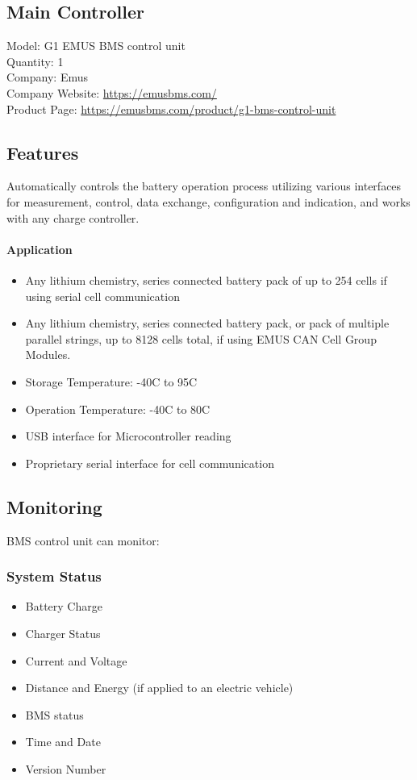 \subsection{Main Controller}

Model: G1 EMUS BMS control unit\\
Quantity: 1\\
Company: Emus\\
Company Website: \href{https://emusbms.com/}{https://emusbms.com/} \\
Product Page: \href{https://emusbms.com/product/g1-bms-control-unit}{https://emusbms.com/product/g1-bms-control-unit} \\

\subsection{Features}
Automatically controls the battery operation process utilizing various interfaces for measurement, control, data exchange, configuration and indication, and works with any charge controller.
\paragraph{Application}
\begin{itemize}
	\item Any lithium chemistry, series connected battery pack of up to 254 cells if using serial cell communication
	\item Any lithium chemistry, series connected battery pack, or pack of multiple parallel strings, up to 8128 cells total, if using EMUS CAN Cell Group Modules.
	\item Storage Temperature: -40\degree C to 95\degree C
	\item Operation Temperature: -40\degree C to 80\degree C
	\item USB interface for Microcontroller reading
	\item Proprietary serial interface for cell communication
\end{itemize}

\subsection{Monitoring}

BMS control unit can monitor:

\subsubsection{System Status}
\begin{itemize}
	\item Battery Charge
	\item Charger Status
	\item Current and Voltage
	\item Distance and Energy (if applied to an electric vehicle)
	\item BMS status
	\item Time and Date
	\item Version Number
\end{itemize}

